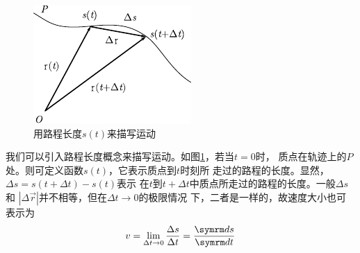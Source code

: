 \setlength{\mathindent}{6em}
\begin{figure}
    \vspace{-6em}
    \centering
    \small
    \includegraphics{figure/fig01.13}
    \caption{用路程长度$s(t)$来描写运动}
    \label{fig:01.13}
\end{figure}
\noindent 我们可以引入路程长度概念来描写运动。如图\ref{fig:01.13}，若当$t=0$时，
质点在轨迹上的$P$处。则可定义函数$s(t)$，它表示质点到$t$时刻所
走过的路程的长度。显然，$\Delta s=s(t+\Delta t)-s(t)$表示
在$t$到$t+\Delta t$中质点所走过的路程的长度。一般$\Delta s$和
$|\Delta \vec{r}|$并不相等，但在$\Delta t \rightarrow 0$的极限情况
下，二者是一样的，故速度大小也可表示为
\begin{equation}\label{eqn:01.07.05}
    v=\lim_{\Delta t \rightarrow 0}\frac{\Delta s}{\Delta t}=\frac{\dif s}{\dif t}
\end{equation}

